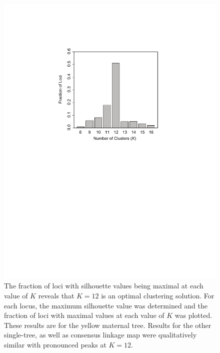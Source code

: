 \documentclass[smallextended]{svjour3}
\begin{document}
\begin{figure}[ht]
  \centering
  \includegraphics[width=\textwidth]{Fig_S1_TGG_foxtail_linkage}
  \caption{The fraction of loci with silhouette values being maximal at each value of $K$ reveals that $K = 12$ is an 
  optimal clustering solution. For each locus, the maximum silhouette value was determined and the fraction of loci  with
  maximal values at each value of $K$ was plotted. These results are for the yellow maternal tree. Results for the other single-tree,
  as well as consensus linkage map were qualitatively similar with pronounced peaks at $K = 12$.}
  \label{f:con}
\end{figure}
\end{document}
